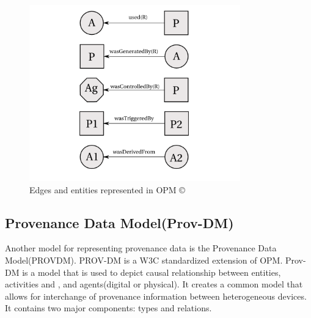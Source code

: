 \begin{figure}[h]
\begin{center}
\includegraphics[height=3.0in]{opm_convention.PNG}
\end{center}
\caption{Edges and entities represented in OPM \copyright \cite{moreau_open_2011}}
\label{autom}
\end{figure}



\subsection{Provenance Data Model(Prov-DM)}

Another model for representing provenance data is the Provenance Data Model(PROV\-DM). PROV-DM is a W3C standardized extension of OPM. Prov-DM is a model that is used to depict causal relationship between entities, activities and , and agents(digital or physical).  It creates a common model that allows for interchange of provenance information between heterogeneous devices. It contains two major components: types and relations. 


